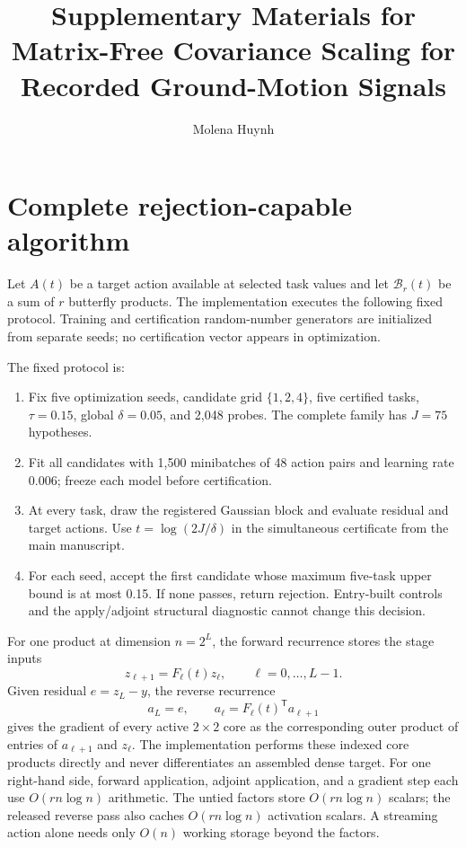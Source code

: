 \documentclass[11pt]{article}
\title{Supplementary Materials for\\
Matrix-Free Covariance Scaling for Recorded Ground-Motion Signals}
\author{Molena Huynh}
\date{}
\newcommand{\BF}{\mathcal{B}}
\begin{document}
\setlength{\emergencystretch}{2em}
\maketitle

\section{Complete rejection-capable algorithm}

Let $A(t)$ be a target action available at selected task values and let
$\BF_r(t)$ be a sum of $r$ butterfly products.  The implementation executes
the following fixed protocol.  Training and certification random-number
generators are initialized from separate seeds; no certification vector
appears in optimization.

The fixed protocol is:
\begin{enumerate}
\item Fix five optimization seeds, candidate grid $\{1,2,4\}$, five certified
tasks, $\tau=0.15$, global $\delta=0.05$, and 2,048 probes.  The complete
family has $J=75$ hypotheses.
\item Fit all candidates with 1,500 minibatches of 48 action pairs and learning
rate 0.006; freeze each model before certification.
\item At every task, draw the registered Gaussian block and evaluate residual
and target actions.  Use $t=\log(2J/\delta)$ in the simultaneous certificate
from the main manuscript.
\item For each seed, accept the first candidate whose maximum five-task upper
bound is at most 0.15.  If none passes, return rejection.  Entry-built controls
and the apply/adjoint structural diagnostic cannot change this decision.
\end{enumerate}

For one product at dimension $n=2^L$, the forward recurrence stores the
stage inputs
\[
  z_{\ell+1}=F_\ell(t)z_\ell,\qquad \ell=0,\ldots,L-1.
\]
Given residual $e=z_L-y$, the reverse recurrence
\[
  a_L=e,\qquad a_\ell=F_\ell(t)^\mathsf{T}a_{\ell+1}
\]
gives the gradient of every active $2\times2$ core as the corresponding
outer product of entries of $a_{\ell+1}$ and $z_\ell$.  The implementation
performs these indexed core products directly and never differentiates an
assembled dense target.  For one right-hand side, forward application,
adjoint application, and a gradient step each use $O(rn\log n)$ arithmetic.
The untied factors store $O(rn\log n)$ scalars; the released reverse pass also
caches $O(rn\log n)$ activation scalars.  A streaming action alone needs only
$O(n)$ working storage beyond the factors.
\end{document}
